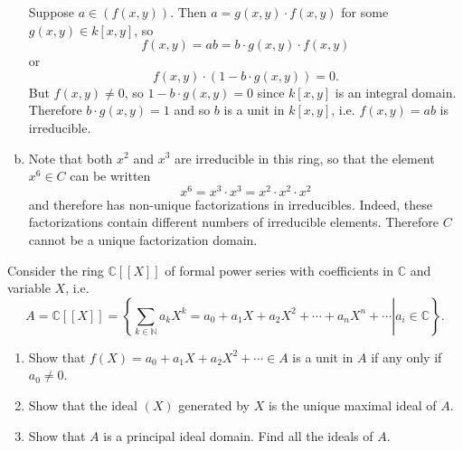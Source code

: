 \documentclass{article}
\newcounter{Problem}
\newenvironment{Problem}{\begin{Exercise}[name={Problem},
                                          counter={Problem}]}
                        {\end{Exercise}}
\begin{document}
\begin{Answer}
\begin{enumerate}[(a)]
{\begin{itemize}
{          Suppose $a \in (f(x,y))$. Then
          $a = g(x,y) \cdot f(x,y)$ for some $g(x,y) \in k[x, y]$, so
          $$
          f(x, y) = ab = b \cdot g(x,y) \cdot f(x,y)
          $$
          or
          $$
          f(x, y) \cdot (1 - b \cdot g(x,y)) = 0.
          $$
          But
          $f(x, y) \neq 0$, so $1 - b \cdot g(x,y) = 0$ since $k[x, y]$
          is an integral domain. Therefore $b \cdot g(x,y) = 1$ and so $b$ is a
          unit in $k[x,y]$, i.e. $f(x,y) = ab$ is irreducible.
        }
      \end{itemize}
    }
    \item{
      Note that both $x^2$ and $x^3$ are irreducible in this ring, so
      that the element $x^6 \in C$ can be written
      $$
      x^6 = x^3 \cdot x^3 = x^2 \cdot x^2 \cdot x^2
      $$
      and therefore has non-unique factorizations in
      irreducibles. Indeed, these factorizations contain different
      numbers of irreducible elements. Therefore $C$ cannot be a unique factorization
      domain.
    }
  \end{enumerate}
\end{Answer}

\pagebreak

\begin{Problem}
  Consider the ring $\mathbb{C}[[X]]$ of formal power series with
  coefficients in $\mathbb{C}$ and variable $X$, i.e.
  $$
  A = \mathbb{C}[[X]] =
  \left\{
    \left.
      \sum_{k \in \mathbb{N}} a_k X^k
    = a_0 + a_1 X + a_2 X^2 + \cdots + a_n X^n + \cdots
    \right|
      a_i \in \mathbb{C}
  \right\}.
  $$
  \begin{enumerate}
    \item{
      Show that $f(X) = a_0 + a_1 X + a_2 X^2 + \cdots \in A$ is a
      unit in $A$ if any only if $a_0 \neq 0$.
    }
    \item{
      Show that the ideal $(X)$ generated by $X$ is the unique maximal
      ideal of $A$.
    }
    \item{
      Show that $A$ is a principal ideal domain. Find all the ideals
      of $A$.
    }
  \end{enumerate}
\end{Problem}
\end{document}
